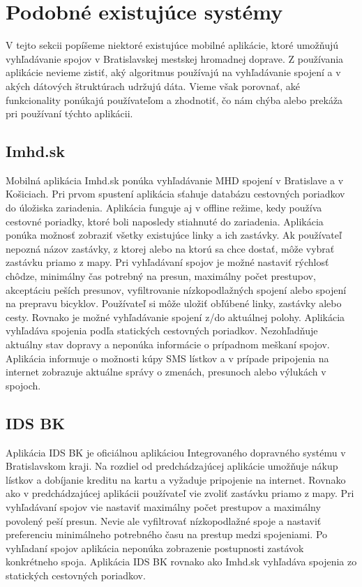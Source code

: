 \section{Podobné existujúce systémy}
\label{sec:applications}
V tejto sekcii popíšeme niektoré existujúce mobilné aplikácie, ktoré umožňujú vyhľadávanie spojov v Bratislavskej mestskej hromadnej doprave. Z používania aplikácie nevieme zistiť, aký algoritmus používajú na vyhľadávanie spojení a v akých dátových štruktúrach udržujú dáta. Vieme však porovnať, aké funkcionality ponúkajú používateľom a zhodnotiť, čo nám chýba alebo prekáža pri používaní týchto aplikácii.

\subsection{Imhd.sk}
Mobilná aplikácia Imhd.sk ponúka vyhľadávanie MHD spojení v Bratislave a v Košiciach. Pri prvom spustení aplikácia sťahuje databázu cestovných poriadkov do úložiska zariadenia. Aplikácia funguje aj v offline režime, kedy používa cestovné poriadky, ktoré boli naposledy stiahnuté do zariadenia. Aplikácia ponúka možnosť zobraziť všetky existujúce linky a ich zastávky. Ak používateľ nepozná názov zastávky, z ktorej alebo na ktorú sa chce dostať, môže vybrať zastávku priamo z mapy. Pri vyhľadávaní spojov je možné nastaviť rýchlosť chôdze, minimálny čas potrebný na presun, maximálny počet prestupov, akceptáciu peších presunov, vyfiltrovanie nízkopodlažných spojení alebo spojení na prepravu bicyklov. Používateľ si môže uložiť obľúbené linky, zastávky alebo cesty. Rovnako je možné vyhľadávanie spojení z/do aktuálnej polohy. Aplikácia vyhľadáva spojenia podľa statických cestovných poriadkov. Nezohľadňuje aktuálny stav dopravy a neponúka informácie o prípadnom meškaní spojov. Aplikácia informuje o možnosti kúpy SMS lístkov a v prípade pripojenia na internet zobrazuje aktuálne správy o zmenách, presunoch alebo výlukách v spojoch.  

\subsection{IDS BK}
Aplikácia IDS BK je oficiálnou aplikáciou Integrovaného dopravného systému v Bratislavskom kraji. Na rozdiel od predchádzajúcej aplikácie umožňuje nákup lístkov a dobíjanie kreditu na kartu a vyžaduje pripojenie na internet. Rovnako ako v predchádzajúcej aplikácii používateľ vie zvoliť zastávku priamo z mapy. Pri vyhľadávaní spojov vie nastaviť maximálny počet prestupov a maximálny povolený peší presun. Nevie ale vyfiltrovať nízkopodlažné spoje a nastaviť preferenciu minimálneho potrebného času na prestup medzi spojeniami. Po vyhľadaní spojov aplikácia neponúka zobrazenie postupnosti zastávok konkrétneho spoja. Aplikácia IDS BK rovnako ako Imhd.sk vyhľadáva spojenia zo statických cestovných poriadkov.  

